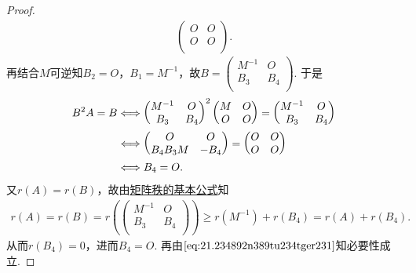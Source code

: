 \documentclass[../../main.tex]{subfiles}
\begin{document}
\begin{proof}
\begin{align*}
\begin{pmatrix}
O&		O\\
O&		O\\
\end{pmatrix}.
\end{align*}
再结合\(M\)可逆知\(B_2 = O\)，\(B_1 = M^{-1}\)，故\(B = \begin{pmatrix}
M^{-1}&		O\\
B_3&		B_4\\
\end{pmatrix}\). 于是
\begin{align}
B^2A = B &\Longleftrightarrow \begin{pmatrix}
M^{-1}&		O\\
B_3&		B_4\\
\end{pmatrix}^2 \begin{pmatrix}
M&		O\\
O&		O\\
\end{pmatrix} = \begin{pmatrix}
M^{-1}&		O\\
B_3&		B_4\\
\end{pmatrix} \notag \\
&\Longleftrightarrow \begin{pmatrix}
O&		O\\
B_4B_3M&		-B_4\\
\end{pmatrix} = \begin{pmatrix}
O&		O\\
O&		O\\
\end{pmatrix} \notag \\
&\Longleftrightarrow B_4 = O. \label{eq:21.234892n389tu234tger231}
\end{align}
又\(r(A) = r(B)\)，故由\hyperref[proposition:矩阵秩的基本公式]{矩阵秩的基本公式}知
\begin{align*}
r(A) = r(B) = r\left( \begin{pmatrix}
M^{-1}&		O\\
B_3&		B_4\\
\end{pmatrix} \right) \geqslant r(M^{-1}) + r(B_4) = r(A) + r(B_4).
\end{align*}
从而\(r(B_4) = 0\)，进而\(B_4 = O\). 再由\(\eqref{eq:21.234892n389tu234tger231}\)知必要性成立.


\end{proof}
\end{document}
